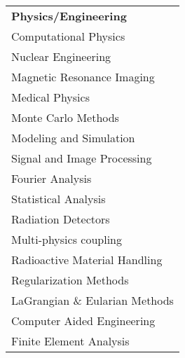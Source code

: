 
\begin{minipage}{0.32\textwidth}
\begin{tabular}{l}
	{\large\textbf{Physics/Engineering}} \\
	\highskillbw Computational Physics \\
	\highskillbw Nuclear Engineering \\
	\highskillbw Magnetic Resonance Imaging \\ 
	\highskillbw Medical Physics \\
	\highskillbw Monte Carlo Methods \\
	\highskillbw Modeling and Simulation \\
	\highskillbw Signal and Image Processing \\
	\highskillbw Fourier Analysis \\ 
	\medskillbw Statistical Analysis \\
	\medskillbw Radiation Detectors \\
	\medskillbw Multi-physics coupling \\
	\medskillbw Radioactive Material Handling \\
	\medskillbw Regularization Methods  \\
	\medskillbw LaGrangian \& Eularian Methods \\
	\lowskillbw Computer Aided Engineering \\
	\lowskillbw Finite Element Analysis \\
\end{tabular}
\end{minipage}%
